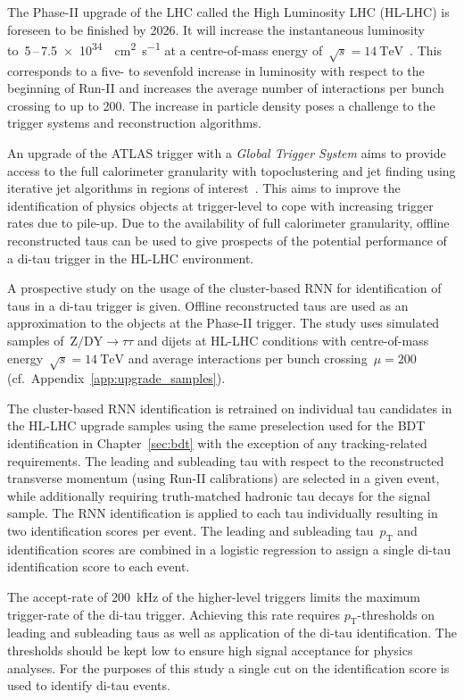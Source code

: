 The Phase-II upgrade of the LHC called the High Luminosity LHC (HL-LHC) is
foreseen to be finished by 2026. It will increase the instantaneous luminosity
to~\num{5}\,--\,\SI{7.5e34}{\per\square\centi\metre\per\second} at a
centre-of-mass energy
of~$\sqrt{s} = \SI{14}{\TeV}$~\cite{hl_lhc_prelim_design_report}. This
corresponds to a five- to sevenfold increase in luminosity with respect to the
beginning of Run-II and increases the average number of interactions per bunch
crossing to up to \num{200}. The increase in particle density poses a challenge
to the trigger systems and reconstruction algorithms.

An upgrade of the ATLAS trigger with a \emph{Global Trigger System} aims to
provide access to the full calorimeter granularity with topoclustering and jet
finding using iterative jet algorithms in regions of
interest~\cite{phase_2_scoping}. This aims to improve the identification of
physics objects at trigger-level to cope with increasing trigger rates due to
pile-up. Due to the availability of full calorimeter granularity, offline
reconstructed taus can be used to give prospects of the potential performance of
a di-tau trigger in the HL-LHC environment.

A prospective study on the usage of the cluster-based RNN for identification of
taus in a di-tau trigger is given. Offline reconstructed taus are used as an
approximation to the objects at the Phase-II trigger. The study uses simulated
samples of~$\text{Z} / \text{DY} \to \tau \tau$ and dijets at HL-LHC conditions
with centre-of-mass energy~$\sqrt{s}=\SI{14}{\TeV}$ and average interactions per
bunch crossing~$\mu = 200$ (cf.\ Appendix~\ref{app:upgrade_samples}).

The cluster-based RNN identification is retrained on individual tau candidates
in the HL-LHC upgrade samples using the same preselection used for the BDT
identification in Chapter~\ref{sec:bdt} with the exception of any
tracking-related requirements. The leading and subleading tau with respect to
the reconstructed transverse momentum (using Run-II calibrations) are selected
in a given event, while additionally requiring truth-matched hadronic tau decays
for the signal sample. The RNN identification is applied to each tau
individually resulting in two identification scores per event. The leading and
subleading tau~$p_\text{T}$ and identification scores are combined in a logistic
regression to assign a single di-tau identification score to each event.

The accept-rate of \SI{200}{\kilo\hertz} of the higher-level triggers limits the
maximum trigger-rate of the di-tau trigger. Achieving this rate requires
$p_\text{T}$-thresholds on leading and subleading taus as well as application of
the di-tau identification. The thresholds should be kept low to ensure high
signal acceptance for physics analyses. For the purposes of this study a single
cut on the identification score is used to identify di-tau events.

